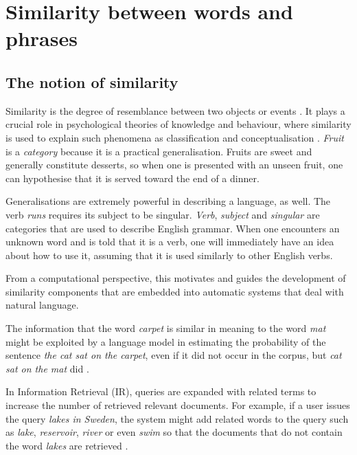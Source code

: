 \chapter{Similarity between words and phrases}
\label{cha:background}

\section{The notion of similarity}
\label{sec:similarity}

Similarity is the degree of resemblance between two objects or events \cite{WCS:WCS1282}. It plays a crucial role in psychological theories of knowledge and behaviour, where similarity is used to explain such phenomena as classification and conceptualisation \cite{Tversky1977,1986-13502-00119860101,medin1993respects,Markman1996,hahn1997concepts}. \textit{Fruit} is a \emph{category} because it is a practical generalisation. Fruits are sweet and generally constitute desserts, so when one is presented with an unseen fruit, one can hypothesise that it is served toward the end of a dinner.

Generalisations are extremely powerful in describing a language, as well. The verb \textit{runs} requires its subject to be singular. \textit{Verb}, \textit{subject} and \textit{singular} are categories that are used to describe English grammar. When one encounters an unknown word and is told that it is a verb, one will immediately have an idea about how to use it, assuming that it is used similarly to other English verbs.

From a computational perspective, this motivates and guides the development of similarity components that are embedded into automatic systems that deal with natural language.

The information that the word \textit{carpet} is similar in meaning to the word \textit{mat} might be exploited by a language model in estimating the probability of the sentence \textit{the cat sat on the carpet}, even if it did not occur in the corpus, but \textit{cat sat on the mat} did \cite{bengio2006}.

In Information Retrieval (IR), queries are expanded with related terms to increase the number of retrieved relevant documents. For example, if a user issues the query \textit{lakes in Sweden}, the system might add related words to the query such as \textit{lake}, \textit{reservoir}, \textit{river} or even \textit{swim} so that the documents that do not contain the word \textit{lakes} are retrieved \cite{Xu:1996:QEU:243199.243202}.

